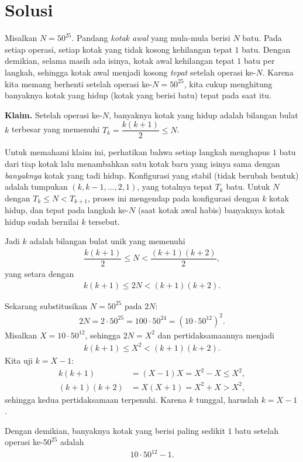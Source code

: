 \newpage
\section{Solusi}
Misalkan $N = 50^{25}$. Pandang \emph{kotak awal} yang mula-mula berisi $N$ batu. Pada setiap operasi, setiap kotak yang tidak kosong kehilangan tepat $1$ batu. Dengan demikian, selama masih ada isinya, kotak awal kehilangan tepat $1$ batu per langkah, sehingga kotak awal menjadi kosong \emph{tepat} setelah operasi ke-$N$. Karena kita memang berhenti setelah operasi ke-$N = 50^{25}$, kita cukup menghitung banyaknya kotak yang hidup (kotak yang berisi batu) tepat pada saat itu.

\medskip
\textbf{Klaim.} Setelah operasi ke-$N$, banyaknya kotak yang hidup adalah bilangan bulat $k$ terbesar yang memenuhi $T_k = \dfrac{k(k+1)}{2} \le N$.

\medskip
Untuk memahami klaim ini, perhatikan bahwa setiap langkah menghapus $1$ batu dari tiap kotak lalu menambahkan satu kotak baru yang isinya sama dengan \emph{banyaknya} kotak yang tadi hidup. Konfigurasi yang stabil (tidak berubah bentuk) adalah tumpukan $ (k, k-1, \dots, 2, 1)$, yang totalnya tepat $T_k$ batu. Untuk $N$ dengan $T_k \le N < T_{k+1}$, proses ini mengendap pada konfigurasi dengan $k$ kotak hidup, dan tepat pada langkah ke-$N$ (saat kotak awal habis) banyaknya kotak hidup sudah bernilai $k$ tersebut.

Jadi $k$ adalah bilangan bulat unik yang memenuhi
\begin{align*}
    \dfrac{k(k+1)}{2} \le N < \dfrac{(k+1)(k+2)}{2},
\end{align*}
yang setara dengan
\begin{align*}
    k(k+1) \le 2N < (k+1)(k+2).
\end{align*}

Sekarang substitusikan $N = 50^{25}$ pada $2N$:
\begin{align*}
    2N = 2\cdot 50^{25} = 100 \cdot 50^{24} = \left(10\cdot 50^{12}\right)^2.
\end{align*}
Misalkan $X = 10\cdot 50^{12}$, sehingga $2N = X^2$ dan pertidaksamaannya menjadi
\begin{align*}
    k(k+1) \le X^2 < (k+1)(k+2).
\end{align*}
Kita uji $k = X-1$:
\begin{align*}
    k(k+1) &= (X-1)X = X^2 - X \le X^2, \\
    (k+1)(k+2) &= X(X+1) = X^2 + X > X^2,
\end{align*}
sehingga kedua pertidaksamaan terpenuhi. Karena $k$ tunggal, haruslah $k = X - 1$.

Dengan demikian, banyaknya kotak yang berisi paling sedikit $1$ batu setelah operasi ke-$50^{25}$ adalah
\begin{align*}
    \boxed{10\cdot 50^{12} - 1}.
\end{align*}
